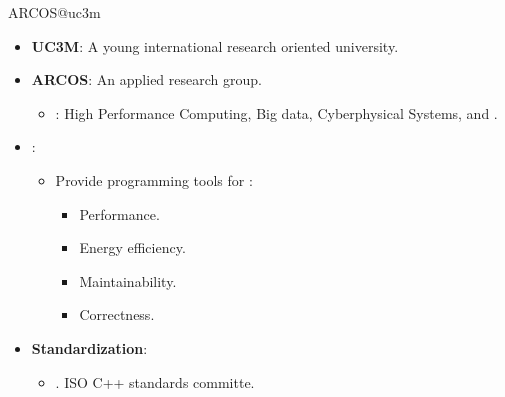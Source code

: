 \begin{frame}{ARCOS@uc3m}
\begin{itemize}
  \item \textbf{UC3M}: A young international research oriented university.

  \vfill
  \item \textbf{ARCOS}: An applied research group.
    \begin{itemize}
      \item {\color{blue}{Lines}}: 
        High Performance Computing,
        Big data,
        Cyberphysical Systems, and
        .
    \end{itemize} 

  \vfill
  \item {}:
    \begin{itemize}
      \item Provide programming tools for :
         \begin{itemize}
           \item Performance.
           \item Energy efficiency.
           \item Maintainability.
           \item Correctness.
         \end{itemize}
    \end{itemize} 

  \vfill
  \item \textbf{Standardization}:
    \begin{itemize}
      \item {}. ISO C++ standards committe.
    \end{itemize}
\end{itemize}
\end{frame}
